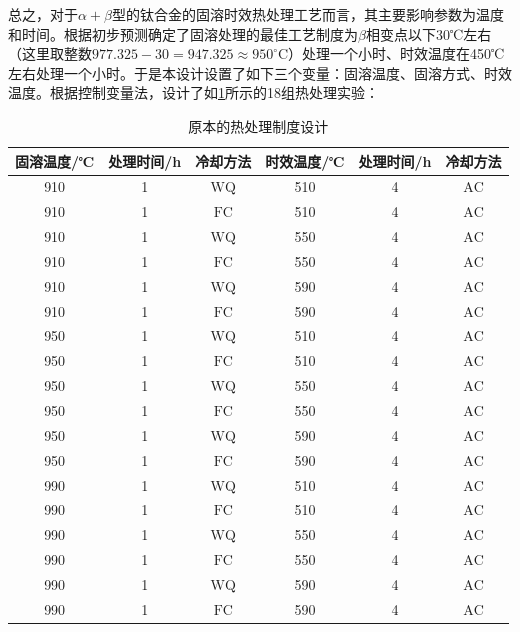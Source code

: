 总之，对于$\alpha+\beta$型的\ti 钛合金的固溶时效热处理工艺而言，其主要影响参数为温度和时间\cite{mirror1,ranxingGurongwenduduiTi6Al4VELItaihejinxianweizuzhijixingnengdeyingxiang2021}。根据初步预测确定了固溶处理的最佳工艺制度为$ \beta $相变点以下30℃左右（这里取整数$ 977.325-30=947.325\approx950^{\circ} \mathrm{C} $）处理一个小时、时效温度在450℃左右处理一个小时。于是本设计设置了如下三个变量：固溶温度、固溶方式、时效温度。根据控制变量法，设计了如\ref{sec:first}所示的18组热处理实验：
\begin{table}[htbp]
	\centering
	\caption{\ti 原本的热处理制度设计}
	\label{sec:first}
	\begin{tabular}{cccccc}
		\toprule
		固溶温度/℃ &处理时间/h & 冷却方法 & 时效温度/℃  &处理时间/h & 冷却方法 \\
		\midrule
		910 & 1 & $\mathrm{WQ}$ & 510 & 4 & $\mathrm{AC}$\\
		910 & 1 & $\mathrm{FC}$  & 510 & 4 & $\mathrm{AC}$ \\
		910 & 1 & $\mathrm{WQ}$ & 550 & 4 & $\mathrm{AC}$ \\
		910 & 1 & $\mathrm{FC}$  & 550 & 4 & $\mathrm{AC}$ \\
		910 & 1 & $\mathrm{WQ}$ & 590 & 4 & $\mathrm{AC}$ \\
		910 & 1 & $\mathrm{FC}$  & 590 & 4 & $\mathrm{AC}$ \\
		\midrule
		950 & 1 & $\mathrm{WQ}$ & 510 & 4 & $\mathrm{AC}$ \\
		950 & 1 & $\mathrm{FC}$ & 510 & 4 & $\mathrm{AC}$ \\
		950 & 1 & $\mathrm{WQ}$ & 550 & 4 & $\mathrm{AC}$ \\
		950 & 1 & $\mathrm{FC}$ & 550 & 4 & $\mathrm{AC}$ \\
		950 & 1 & $\mathrm{WQ}$ & 590 & 4 & $\mathrm{AC}$ \\
		950 & 1 & $\mathrm{FC}$ & 590 & 4 & $\mathrm{AC}$ \\
		\midrule
		990 & 1 & $\mathrm{WQ}$ & 510 & 4 & $\mathrm{AC}$ \\
		990 & 1 & $\mathrm{FC}$ & 510 & 4 & $\mathrm{AC}$ \\
		990 & 1 & $\mathrm{WQ}$ & 550 & 4 & $\mathrm{AC}$ \\
		990 & 1 & $\mathrm{FC}$ & 550 & 4 & $\mathrm{AC}$ \\
		990 & 1 & $\mathrm{WQ}$ & 590 & 4 & $\mathrm{AC}$ \\
		990 & 1 & $\mathrm{FC}$ & 590 & 4 & $\mathrm{AC}$ \\
		\bottomrule
	\end{tabular}
\end{table}


